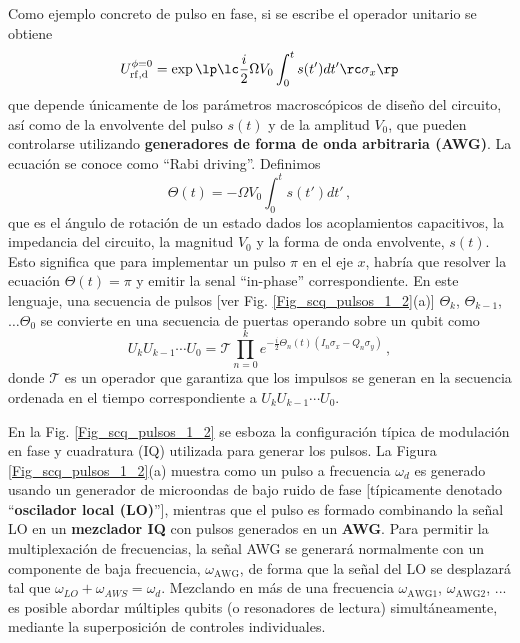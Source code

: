         Como ejemplo concreto de pulso en fase, si se escribe el operador unitario se obtiene
        \begin{equation} \label{ec_scq_rabi}
            U_{\mathrm{rf,d}}^{\phi = 0} = \exp \lp \lc  \frac{i}{2} \Omega V_0 \int_0^t s(t') dt' \rc \sigma_x \rp
        \end{equation}
        que depende únicamente de los parámetros macroscópicos de diseño del circuito, así como de la envolvente del pulso $s(t)$ y de la amplitud $V_0$, que pueden controlarse utilizando \textbf{generadores de forma de onda arbitraria (AWG)}. La ecuación  se conoce como ``Rabi driving''. Definimos 
        \begin{equation}
            \Theta(t) =  - \Omega V_0 \int_0^t s(t') dt'\,,
        \end{equation}
        que es el ángulo de rotación de un estado dados los acoplamientos capacitivos, la impedancia del circuito, la magnitud $V_0$ y la forma de onda envolvente, $s(t)$. Esto significa que para implementar un pulso $\pi$ en el eje $x$, habría que resolver la ecuación $\Theta (t) = \pi$ y emitir la senal ``in-phase'' correspondiente. En este lenguaje, una secuencia de pulsos [ver Fig. \ref{Fig_scq_pulsos_1_2}(a)] $\Theta_k$, $\Theta_{k-1}$, $\dots \Theta_0$  se convierte en una secuencia de puertas operando sobre un qubit como
        \begin{equation} \label{ec_scq_pulse_secuence_one_qubit}
            U_k U_{k-1} \cdots U_0 = \mathcal{T} \prod_{n=0}^k e^{- \frac{i}{2} \Theta_n(t) (I_n \sigma_x - Q_n \sigma_y)} \, ,
        \end{equation}
         donde $\mathcal{T}$ es un operador que garantiza que los impulsos se generan en la secuencia ordenada en el tiempo correspondiente a $U_k U_{k-1} \cdots U_0 $.


        En la Fig. \ref{Fig_scq_pulsos_1_2} se esboza la configuración típica de modulación en fase y cuadratura (IQ) utilizada para generar los pulsos. La Figura  \ref{Fig_scq_pulsos_1_2}(a) muestra como un pulso a frecuencia $\omega_d$ es generado usando un generador de microondas de bajo ruido de fase [típicamente denotado ``\textbf{oscilador local (LO)}''], mientras que el pulso es formado combinando la señal LO en un \textbf{mezclador IQ} con pulsos generados en un \textbf{AWG}. Para permitir la multiplexación de frecuencias, la señal AWG se generará normalmente con un componente de baja frecuencia, $\omega_{\mathrm{AWG}}$, de forma que la señal del LO se desplazará tal que $\omega_{LO} + \omega_{AWS} = \omega_d$. Mezclando en más de una frecuencia $\omega_{\mathrm{AWG1}}$, $\omega_{\mathrm{AWG2}}$, ... es posible abordar múltiples qubits (o resonadores de lectura) simultáneamente, mediante la superposición de controles individuales. 
        

